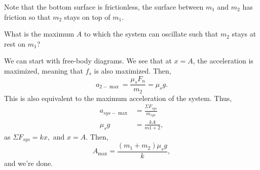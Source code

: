 \documentclass[11pt]{article}
\begin{document}
Note that the bottom surface is frictionless, the surface between $m_1$ and $m_2$ has friction so that $m_2$ stays on top of $m_1$.
\begin{question}
	What is the maximum $A$ to which the system can oscillate such that $m_2$ stays at rest on $m_1$?
\end{question}
\begin{solution}
We can start with free-body diagrams. We see that at $x=A$, the acceleration is maximized, meaning that $f_s$ is also maximized. Then,
\[a_{2-\max} = \frac{\mu_sF_n}{m_2} = \mu_sg.\]
This is also equivalent to the maximum acceleration of the system. Thus,
\begin{align*}
	a_{sys-\max} &= \frac{\Sigma F_{sys}}{m_{sys}} \\
	\mu_s g &= \frac{kA}{m1+2},
\end{align*}
as $\Sigma F_{sys} = kx,$ and $x = A$. Then,
\[A_{\max} = \boxed{\frac{(m_1+m_2)\mu_s g}{k}},\]
and we're done.
\end{solution}
\end{document}

